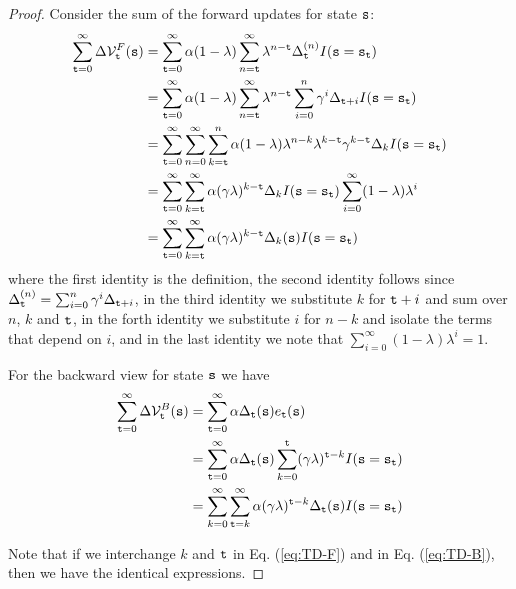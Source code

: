 \begin{proof}
Consider the sum of the forward updates for state ${\tt s}$:
\begin{align}
\sum_{\ttime=0}^{\infty } \Delta \Value^F_\ttime (\state)&=
\sum_{\ttime=0}^{\infty} \alpha
(1-\lambda) \sum_{n=\ttime}^{\infty} \lambda^{n-\ttime}\Delta_\ttime^{(n)} I(\state=\state_\ttime)\nonumber\\
%
&= \sum_{\ttime=0}^{\infty}  \alpha
(1-\lambda) \sum_{n=\ttime}^{\infty} \lambda^{n-\ttime}\sum_{i=0}^n \discount^i \Delta_{\ttime+i} I(\state=\state_\ttime)\nonumber\\
%
&=\sum_{\ttime=0}^\infty \sum_{n=0}^\infty \sum_{k=\ttime}^n \alpha
(1-\lambda)
\lambda^{n-k}\lambda^{k-\ttime}\discount^{k-\ttime}\Delta_k I(\state=\state_\ttime)\nonumber\\
%
&=\sum_{\ttime=0}^\infty \sum_{k=\ttime}^\infty \alpha
(\discount\lambda)^{k-\ttime}\Delta_k I(\state=\state_\ttime) \sum_{i=0}^\infty (1-\lambda)\lambda^{i}\nonumber\\
%
&= \sum_{\ttime=0}^\infty \sum_{k=\ttime}^\infty \alpha
(\discount\lambda)^{k-\ttime} \Delta_k(\state)
I(\state=\state_\ttime) \label{eq:TD-F}
\end{align}
where the first identity is the definition, the second identity
follows since $\Delta_{\tt t}^{(n)}=\sum_{i=0}^n\gamma^i
\Delta_{{\tt t}+i}$, in the third identity we substitute $k$ for
${\tt t}+i$ and sum over $n$, $k$ and ${\tt t}$, in the forth identity we
substitute $i$ for $n-k$ and isolate the terms that depend on $i$,
and in the last identity we note that $\sum_{i=0}^\infty
(1-\lambda)\lambda^{i}=1$.

For the backward view for state ${\tt s}$ we have
\begin{align}
\sum_{{\tt t}=0}^{\infty } \Delta \mathcal{V}^B_{\tt t} ({\tt s})&=\sum_{{\tt t}=0}^{\infty} \alpha
\Delta_{\tt t}({\tt s}) e_{{\tt t}}({\tt s})\\
&=\sum_{{\tt t}=0}^{\infty} \alpha
\Delta_{\tt t}({\tt s}) \sum_{k=0}^{\tt t} (\gamma\lambda)^{{\tt t}-k} I({\tt s}={\tt s}_{\tt t})\nonumber\\
&= \sum_{k=0}^\infty \sum_{{\tt t}=k}^\infty \alpha
(\gamma\lambda)^{{\tt t}-k}\Delta_{\tt t}({\tt s})I({\tt s}={\tt s}_{\tt t})
\label{eq:TD-B}
\end{align}

Note that if we interchange $k$ and ${\tt t}$ in Eq. (\ref{eq:TD-F})
and in Eq. (\ref{eq:TD-B}), then we have the identical expressions.
\end{proof}

